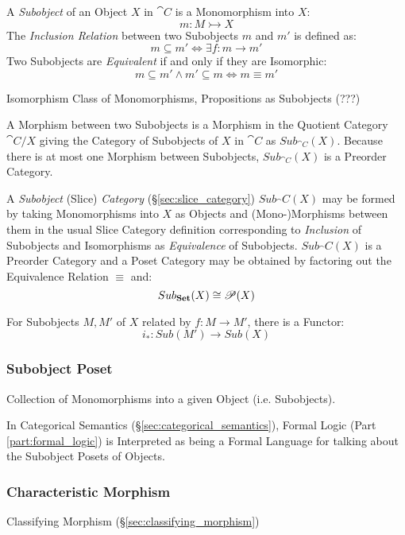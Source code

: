 A \emph{Subobject} of an Object $X$ in $\cat{C}$ is a Monomorphism
into $X$:
\[
  m : M \rightarrowtail X
\]
The \emph{Inclusion Relation} between two Subobjects $m$ and $m'$ is
defined as:
\[
  m \subseteq m' \Leftrightarrow \exists f : m \rightarrow m'
\]
Two Subobjects are \emph{Equivalent} if and only if they are
Isomorphic:
\[
  m \subseteq m' \wedge m' \subseteq m \Leftrightarrow m \equiv m'
\]

Isomorphism Class of Monomorphisms, Propositions as Subobjects (???)

A Morphism between two Subobjects is a Morphism in the Quotient
Category $\cat{C}/X$ giving the Category of Subobjects of $X$ in
$\cat{C}$ as $Sub_{\cat{C}}(X)$. Because there is at most one
Morphism between Subobjects, $Sub_{\cat{C}}(X)$ is a Preorder
Category.

A \emph{Subobject} (Slice) \emph{Category}
(\S\ref{sec:slice_category}) $Sub_\cat{C}(X)$ may be formed by
taking Monomorphisms into $X$ as Objects and (Mono-)Morphisms between
them in the usual Slice Category definition corresponding to
\emph{Inclusion} of Subobjects and Isomorphisms as \emph{Equivalence}
of Subobjects. $Sub_\cat{C}(X)$ is a Preorder Category and a Poset
Category may be obtained by factoring out the Equivalence Relation
$\equiv$ and:
\[
  Sub_\mathbf{Set}(X) \cong \mathscr{P}(X)
\]

For Subobjects $M,M'$ of $X$ related by $f : M \rightarrow M'$, there
is a Functor:
\[
  i_* : Sub (M') \rightarrow Sub (X)
\]



\subsubsection{Subobject Poset}\label{sec:subobject_poset}

Collection of Monomorphisms into a given Object (i.e. Subobjects).

In Categorical Semantics (\S\ref{sec:categorical_semantics}), Formal
Logic (Part \ref{part:formal_logic}) is Interpreted as being a Formal
Language for talking about the Subobject Posets of Objects.



\subsubsection{Characteristic Morphism}
\label{sec:characteristic_morphism}

Classifying Morphism (\S\ref{sec:classifying_morphism})



